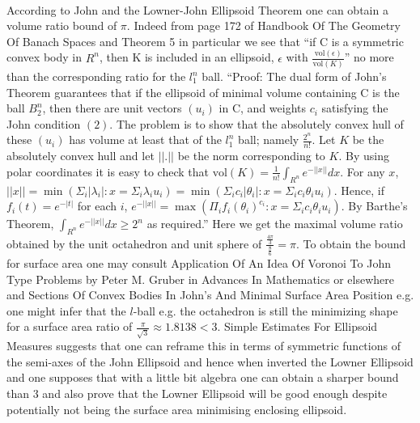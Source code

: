  \\
According to John and the Lowner-John Ellipsoid Theorem one can obtain a volume ratio bound of $\pi$. Indeed from page 172 of Handbook Of The Geometry Of Banach Spaces and Theorem 5 in particular we see that ``if C is a symmetric convex body in $R^n$, then K is included in an ellipsoid, $\epsilon$ with $\frac{\text{vol}(\epsilon)}{\text{vol}(K)}$'' no more than the corresponding ratio for the $l_1^n$ ball. ``Proof: The dual form of John's Theorem guarantees that if the ellipsoid of minimal volume containing C is the ball $B_2^n$, then there are unit vectors $(u_i)$ in C, and weights $c_i$ satisfying the John condition $(2)$. The problem is to show that the absolutely convex hull of these $(u_i)$ has volume at least that of the $l_1^n$ ball; namely $\frac{2^n}{n!}$. Let $K$ be the absolutely convex hull and let $||.||$ be the norm corresponding to $K$. By using polar coordinates it is easy to check that $\text{vol}(K ) = \frac{1}{n!} \int_{R^n} e^{-||x||}dx$. For any $x$, $||x||=\min(\Sigma_i |\lambda_i|: x = \Sigma_i \lambda_i u_i)=\min(\Sigma_i c_i |\theta_i|: x = \Sigma_i c_i \theta_i u_i)$. Hence, if $f_i(t)=e^{-|t|}$ for each $i$, $e^{-||x||}=\max(\Pi_i f_i(\theta_i)^{c_i}: x = \Sigma_i c_i \theta_i u_i)$. By Barthe's Theorem, $\int_{R^n} e^{-||x||} dx \ge 2^n$ as required.'' Here we get the maximal volume ratio obtained by the unit octahedron and unit sphere of $\frac{\frac{4\pi}{3}}{\frac{8}{6}}=\pi$. To obtain the bound for surface area one may consult Application Of An Idea Of Voronoi To John Type Problems by Peter M. Gruber in Advances In Mathematics or elsewhere and Sections Of Convex Bodies In John's And Minimal Surface Area Position e.g. one might infer that the $l$-ball e.g. the octahedron is still the minimizing shape for a surface area ratio of $\frac{\pi}{\sqrt{3}}\approx 1.8138<3$. Simple Estimates For Ellipsoid Measures suggests that one can reframe this in terms of symmetric functions of the semi-axes of the John Ellipsoid and hence when inverted the Lowner Ellipsoid and one supposes that with a little bit algebra one can obtain a sharper bound than $3$ and also prove that the Lowner Ellipsoid will be good enough despite potentially not being the surface area minimising enclosing ellipsoid.


